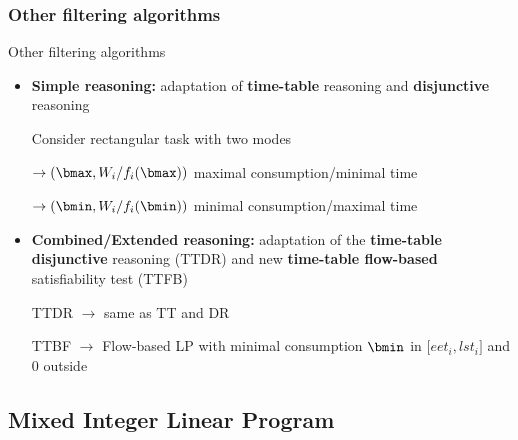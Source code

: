 \subsubsection{Other filtering algorithms}

\begin{frame}{Other filtering algorithms}
\vfill
\begin{itemize}
\item {\bf \color{blue!80!black!80} Simple reasoning: } adaptation of
  {\bf time-table} reasoning and {\bf disjunctive} reasoning
\vfill
{\color{gray!80!black!80}{\it Idea: } Consider rectangular task with two modes

  $\rightarrow (\bmax, W_i/f_i(\bmax))$ maximal consumption/minimal time

  $\rightarrow (\bmin, W_i/f_i(\bmin))$ minimal consumption/maximal
  time}
  \vfill
\item {\bf \color{blue!80!black!80} Combined/Extended reasoning: }
  adaptation of the {\bf time-table disjunctive} reasoning (TTDR) and
  new {\bf time-table flow-based} satisfiability test (TTFB)
  \vfill
  {\color{gray!80!black!80}{\it Idea: } TTDR $\rightarrow$ same as TT and DR

  TTBF $\rightarrow$ Flow-based LP with minimal consumption $\bmin$ in
  ${[}eet_i,lst_i {]}$ and $0$ outside}
\end{itemize}
\vfill
\end{frame}


\subsection{Mixed Integer Linear Program}


